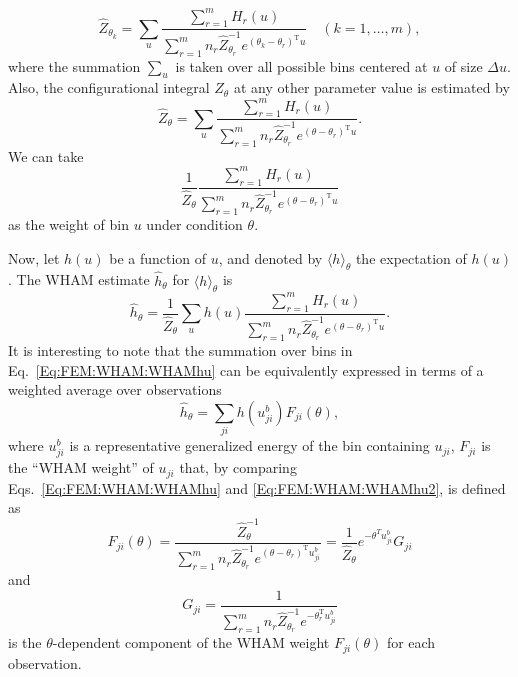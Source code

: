 \begin{equation}
    \hat{Z}_{\theta_k}=\sum_{u}\frac{\sum_{r=1}^m H_r(u)}{\sum_{r=1}^m n_r\hat{Z}_{\theta_r}^{-1}e^{(\theta_k-\theta_r)^\mathrm{T}u}}\quad (k=1,\dots,m),
    \label{Eq:FEM:WHAM:binnedZ}
\end{equation}
where the summation $\sum_u$ is taken over all possible bins centered at $u$ of size $\Delta u$. Also, the configurational integral $Z_\theta$ at any other parameter value is estimated by
\begin{equation}
    \hat{Z}_\theta=\sum_{u}\frac{\sum_{r=1}^m H_r(u)}{\sum_{r=1}^m n_r\hat{Z}_{\theta_r}^{-1}e^{(\theta-\theta_r)^\mathrm{T}u}}.
    \label{Eq:FEM:WHEM:binweight1}
\end{equation}
We can take
\begin{equation}
    \frac{1}{\hat{Z}_\theta}\frac{\sum_{r=1}^m H_r(u)}{\sum_{r=1}^m n_r\hat{Z}_{\theta_r}^{-1}e^{(\theta-\theta_r)^\mathrm{T}u}}
    \label{Eq:FEM:WHEM:binweight2}
\end{equation}
as the weight of bin $u$ under condition $\theta$.

Now, let $h(u)$ be a function of $u$, and denoted by $\langle h\rangle_\theta$ the expectation of $h(u)$. The WHAM estimate $\hat{h}_\theta$ for $\langle h\rangle_\theta$ is
\begin{equation}
    \hat{h}_\theta=\frac{1}{\hat{Z}_\theta}\sum_u h(u) \frac{\sum_{r=1}^m H_r(u)}{\sum_{r=1}^m n_r\hat{Z}_{\theta_r}^{-1}e^{(\theta-\theta_r)^\mathrm{T}u}}.
    \label{Eq:FEM:WHAM:WHAMhu}
\end{equation}
It is interesting to note that the summation over bins in Eq.~\ref{Eq:FEM:WHAM:WHAMhu} can be equivalently expressed in terms of a weighted average over observations
\begin{equation}
    \hat{h}_{\theta}=\sum_{ji}h(u_{ji}^b)F_{ji}(\theta),
    \label{Eq:FEM:WHAM:WHAMhu2}
\end{equation}
where $u_{ji}^b$ is a representative generalized energy of the bin containing $u_{ji}$, $F_{ji}$ is the ``WHAM weight'' of $u_{ji}$ that, by comparing Eqs.~\ref{Eq:FEM:WHAM:WHAMhu} and \ref{Eq:FEM:WHAM:WHAMhu2}, is defined as
\begin{equation}
    F_{ji}(\theta)=\frac{\hat{Z}_\theta^{-1}}{\sum_{r=1}^mn_r\hat{Z}_{\theta_r}^{-1}e^{(\theta-\theta_r)^\mathrm{T}u_{ji}^b}}=\frac{1}{\hat{Z}_\theta}e^{-\theta^Tu_{ji}^b}G_{ji}
    \label{Eq:FEM:WHAM:sampleW}
\end{equation}
and 
\begin{equation}
    G_{ji}=\frac{1}{\sum_{r=1}^m n_r\hat{Z}_{\theta_r}^{-1}e^{-\theta_r^\mathrm{T}u_{ji}^b}}
\end{equation}
is the $\theta$-dependent component of the WHAM weight $F_{ji}(\theta)$ for each observation.

